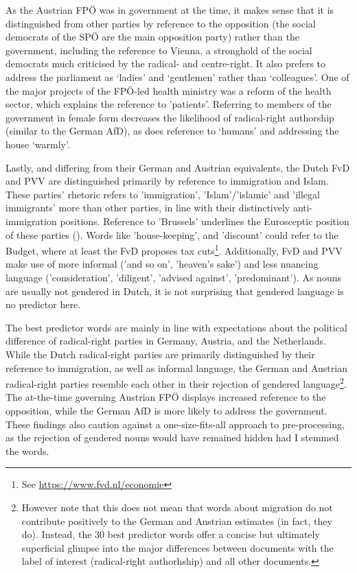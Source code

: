 \documentclass{article}
\begin{document}
As the Austrian FPÖ was in government at the time, it makes sense that it is distinguished from other parties by reference to the opposition (the social democrats of the SPÖ are the main opposition party) rather than the government, including the reference to Vienna, a stronghold of the social democrats much criticised by the radical- and centre-right. It also prefers to address the parliament as ‘ladies’ and ‘gentlemen’ rather than ‘colleagues’. One of the major projects of the FPÖ-led health ministry was a reform of the health sector, which explains the reference to 'patients'. Referring to members of the government in female form decreases the likelihood of radical-right authorship (similar to the German AfD), as does reference to ‘humans’ and addressing the house ‘warmly’.\par

Lastly, and differing from their German and Austrian equivalents, the Dutch FvD and PVV are distinguished primarily by reference to immigration and Islam. These parties' rhetoric refers to 'immigration', 'Islam'/'islamic' and 'illegal immigrants' more than other parties, in line with their distinctively anti-immigration positions. Reference to 'Brussels' underlines the Eurosceptic position of these parties (\cite{ThePopulist2019}). Words like 'house-keeping', and 'discount' could refer to the Budget, where at least the FvD proposes tax cuts\footnote{See \url{https://www.fvd.nl/economie}}. Additionally, FvD and PVV make use of more informal ('and so on', 'heaven’s sake') and less nuancing language ('consideration', 'diligent', 'advised against', 'predominant'). As nouns are usually not gendered in Dutch, it is not surprising that gendered language is no predictor here.\par

The best predictor words are mainly in line with expectations about the political difference of radical-right parties in Germany, Austria, and the Netherlands. While the Dutch radical-right parties are primarily distinguished by their reference to immigration, as well as informal language, the German and Austrian radical-right parties resemble each other in their rejection of gendered language\footnote{However note that this does not mean that words about migration do not contribute positively to the German and Austrian estimates (in fact, they do). Instead, the 30 best predictor words offer a concise but ultimately superficial glimpse into the major differences between documents with the label of interest (radical-right authorhship) and all other documents.}. The at-the-time governing Austrian FPÖ displays increased reference to the opposition, while the German AfD is more likely to address the government. These findings also caution against a one-size-fits-all approach to pre-processing, as the rejection of gendered nouns would have remained hidden had I stemmed the words.\par
\end{document}
